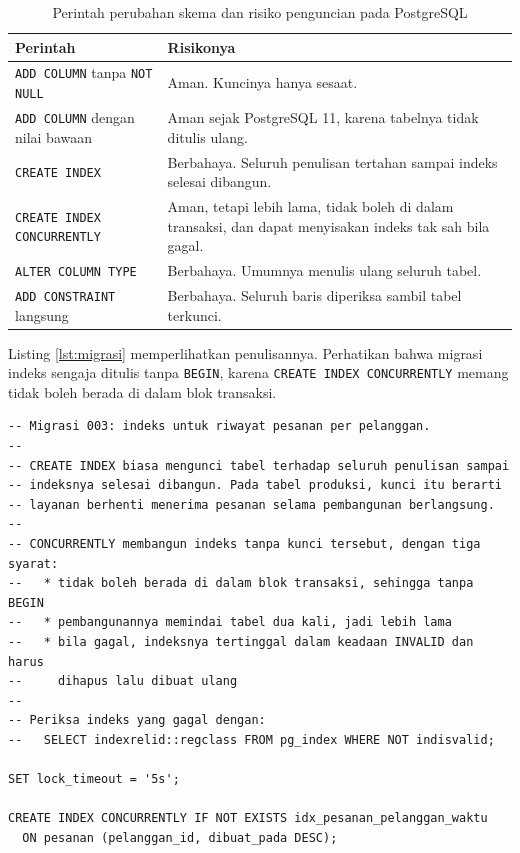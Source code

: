 \begin{table}[!htb]
  \centering
  \caption{Perintah perubahan skema dan risiko penguncian pada PostgreSQL}
  \label{tab:migrasi-kunci}
  \begin{tabularx}{\textwidth}{lX}
    \hline
    \textbf{Perintah} & \textbf{Risikonya} \\
    \hline
    \texttt{ADD COLUMN} tanpa \texttt{NOT NULL} & Aman. Kuncinya hanya sesaat. \\
    \hline
    \texttt{ADD COLUMN} dengan nilai bawaan & Aman sejak PostgreSQL 11, karena tabelnya tidak ditulis ulang. \\
    \hline
    \texttt{CREATE INDEX} & Berbahaya. Seluruh penulisan tertahan sampai indeks selesai dibangun. \\
    \hline
    \texttt{CREATE INDEX CONCURRENTLY} & Aman, tetapi lebih lama, tidak boleh di dalam transaksi, dan dapat menyisakan indeks tak sah bila gagal. \\
    \hline
    \texttt{ALTER COLUMN TYPE} & Berbahaya. Umumnya menulis ulang seluruh tabel. \\
    \hline
    \texttt{ADD CONSTRAINT} langsung & Berbahaya. Seluruh baris diperiksa sambil tabel terkunci. \\
    \hline
  \end{tabularx}
\end{table}

Listing \ref{lst:migrasi} memperlihatkan penulisannya. Perhatikan bahwa migrasi
indeks sengaja ditulis tanpa \texttt{BEGIN}, karena
\texttt{CREATE INDEX CONCURRENTLY} memang tidak boleh berada di dalam blok
transaksi.

\begin{lstlisting}[style=SqlStyle, caption={Migrasi indeks tanpa menghentikan penulisan, tersedia di \berkas{sources/chapter03/migrasi/003_indeks_pesanan.sql}}, label={lst:migrasi}]
-- Migrasi 003: indeks untuk riwayat pesanan per pelanggan.
--
-- CREATE INDEX biasa mengunci tabel terhadap seluruh penulisan sampai
-- indeksnya selesai dibangun. Pada tabel produksi, kunci itu berarti
-- layanan berhenti menerima pesanan selama pembangunan berlangsung.
--
-- CONCURRENTLY membangun indeks tanpa kunci tersebut, dengan tiga syarat:
--   * tidak boleh berada di dalam blok transaksi, sehingga tanpa BEGIN
--   * pembangunannya memindai tabel dua kali, jadi lebih lama
--   * bila gagal, indeksnya tertinggal dalam keadaan INVALID dan harus
--     dihapus lalu dibuat ulang
--
-- Periksa indeks yang gagal dengan:
--   SELECT indexrelid::regclass FROM pg_index WHERE NOT indisvalid;

SET lock_timeout = '5s';

CREATE INDEX CONCURRENTLY IF NOT EXISTS idx_pesanan_pelanggan_waktu
  ON pesanan (pelanggan_id, dibuat_pada DESC);
\end{lstlisting}

